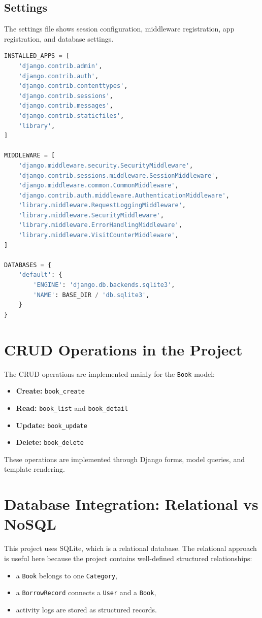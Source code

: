 \documentclass[12pt,a4paper]{article}
\begin{document}
\subsection{Settings}
The settings file shows session configuration, middleware registration, app registration, and database settings.

\begin{lstlisting}[language=Python, caption=Important settings.py Sections]
INSTALLED_APPS = [
    'django.contrib.admin',
    'django.contrib.auth',
    'django.contrib.contenttypes',
    'django.contrib.sessions',
    'django.contrib.messages',
    'django.contrib.staticfiles',
    'library',
]

MIDDLEWARE = [
    'django.middleware.security.SecurityMiddleware',
    'django.contrib.sessions.middleware.SessionMiddleware',
    'django.middleware.common.CommonMiddleware',
    'django.contrib.auth.middleware.AuthenticationMiddleware',
    'library.middleware.RequestLoggingMiddleware',
    'library.middleware.SecurityMiddleware',
    'library.middleware.ErrorHandlingMiddleware',
    'library.middleware.VisitCounterMiddleware',
]

DATABASES = {
    'default': {
        'ENGINE': 'django.db.backends.sqlite3',
        'NAME': BASE_DIR / 'db.sqlite3',
    }
}
\end{lstlisting}

\section{CRUD Operations in the Project}
The CRUD operations are implemented mainly for the \texttt{Book} model:
\begin{itemize}
    \item \textbf{Create:} \texttt{book\_create}
    \item \textbf{Read:} \texttt{book\_list} and \texttt{book\_detail}
    \item \textbf{Update:} \texttt{book\_update}
    \item \textbf{Delete:} \texttt{book\_delete}
\end{itemize}

These operations are implemented through Django forms, model queries, and template rendering.

\section{Database Integration: Relational vs NoSQL}
This project uses SQLite, which is a relational database. The relational approach is useful here because the project contains well-defined structured relationships:
\begin{itemize}
    \item a \texttt{Book} belongs to one \texttt{Category},
    \item a \texttt{BorrowRecord} connects a \texttt{User} and a \texttt{Book},
    \item activity logs are stored as structured records.
\end{itemize}
\end{document}
